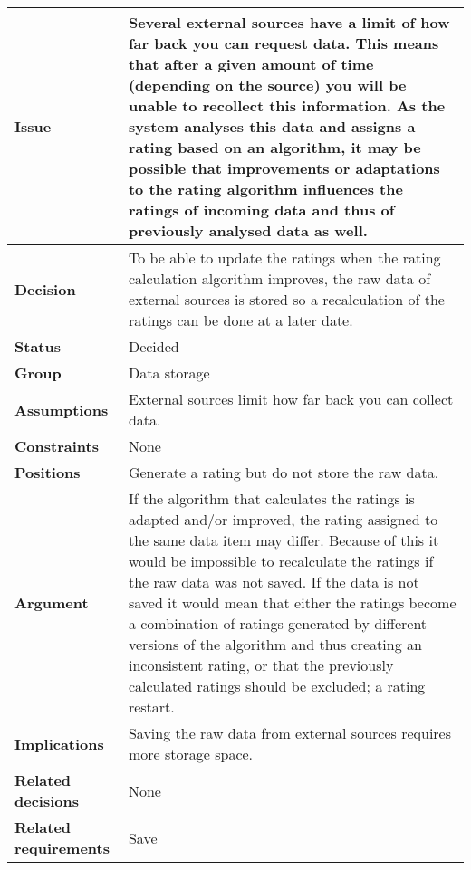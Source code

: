 
\label{dd:save-raw}
\begin{tabular}{ l  p{10cm}}
\hline
\bf Issue & Several external sources have a limit of how far back you can request data. This means that after a given amount of time (depending on the source) you will be unable to recollect this information. As the system analyses this data and assigns a rating based on an algorithm, it may be possible that improvements or adaptations to the rating algorithm influences the ratings of incoming data and thus of previously analysed data as well. \\
\hline
\bf Decision & To be able to update the ratings when the rating calculation algorithm improves, the raw data of external sources is stored so a recalculation of the ratings can be done at a later date. \\
\hline
\bf Status & Decided \\
\hline
\bf Group & Data storage \\
\hline
\bf Assumptions & External sources limit how far back you can collect data. \\
\hline
\bf Constraints & None\\
\hline
\bf Positions & Generate a rating but do not store the raw data. \\
\hline
\bf Argument & If the algorithm that calculates the ratings is adapted and/or improved, the rating assigned to the same data item may differ. Because of this it would be impossible to recalculate the ratings if the raw data was not saved. \newline
If the data is not saved it would mean that either the ratings become a combination of ratings generated by different versions of the algorithm and thus creating an inconsistent rating, or that the previously calculated ratings should be excluded; a rating restart. \\
\hline
\bf Implications & Saving the raw data from external sources requires more storage space. \\
\hline
\bf Related decisions & None \\
\hline
\bf Related requirements & Save \\
\hline
\end{tabular}
